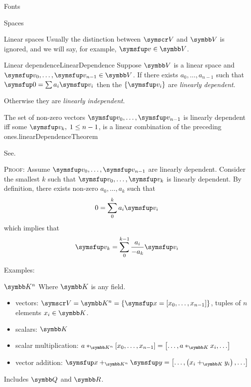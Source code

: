 \documentclass[12pt]{PalisadesLakesArticle}
\begin{document}
\begin{plSection}{Fonts}
\begin{plSection}{Spaces}
\begin{plSection}{Linear spaces}
Usually the distinction between $\Set{V}$ and $\Space{V}$ 
is ignored, and we will say, for example, 
$\Vector{v} \in \Space{V}$.

\begin{plDefinition}{Linear dependence}{LinearDependence}
Suppose $\Space{V}$ is a linear space and
$\Vector{v}_0, \ldots , \Vector{v}_{n-1} \in \Space{V}$.
If there exists $a_0, \ldots , a_{n-1}$ such that
$\Vector{0} = \sum a_i \Vector{v}_i$ then the $\{ \Vector{v}_i \}$
are \textit{linearly dependent}.

Otherwise they are \textit{linearly independent}.
\end{plDefinition}

\begin{plTheorem}{The set of non-zero vectors
 $\Vector{v}_0, \ldots ,\Vector{v}_{n-1}$
is linearly dependent iff some $\Vector{v}_k, \; 1 \leq n-1$, 
is a linear combination of the preceding 
ones.}{linearDependenceTheorem}

See.

\textsc{Proof:}
Assume  $\Vector{v}_0, \ldots ,\Vector{v}_{n-1}$ are linearly dependent.
Consider the smallest $k$ such that 
$\Vector{v}_0, \ldots ,\Vector{v}_{k}$ is linearly dependent.
By definition,
there exists non-zero $a_0, \ldots ,a_{k}$ such that
\begin{equation}
0 = \sum_0^k a_i \Vector{v}_i
\end{equation}
which implies that
\begin{equation}
\Vector{v}_k = \sum_0^{k-1} \frac{a_i}{- a_k} \Vector{v}_i
\end{equation}
\end{plTheorem}

Examples:

\begin{plExample}{$\Space{K}^n$}{}
Where $\Space{K}$ is any field.
\begin{itemize}
  \item vectors:
  $\Set{V} = \Space{K}^n = \left\{ \Vector{x}
  = \left[ x_0, \ldots , x_{n-1} \right] \right\}$,
  tuples of $n$ elements $x_i \in \Space{K}$.
  \item scalars: $\Space{K}$
  \item scalar multiplication:
  $ a *_{\Space{K}^n} \left[ x_0, \ldots , x_{n-1} \right] =
  \left[ \ldots , a *_{\Space{K}} x_{i} , \ldots \right]$
  \item vector addition:
  $\Vector{x} +_{\Space{K}^n} \Vector{y}
  = \left[ \ldots , \left( x_i +_{\Space{K}} y_i \right) ,\ldots \right]$
\end{itemize}
Includes $\Space{Q}$ and $\Space{R}$.
\end{plExample}


\end{plSection}
\end{plSection}
\end{plSection}
\end{document}
